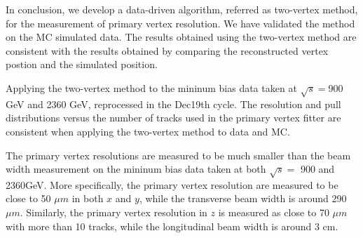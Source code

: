 In conclusion, we develop a data-driven algorithm, referred as two-vertex method, for the measurement of primary vertex resolution. We have validated the 
method on the MC simulated data. The results obtained using the 
two-vertex method are consistent with the results obtained by comparing 
the reconstructed vertex postion and the simulated position. 

Applying the two-vertex method to the mininum bias data taken at 
$\sqrt{s}=$900 GeV and 2360 GeV, reprocessed in the Dec19th cycle. 
The resolution and pull distributions versus the number 
of tracks used in the primary vertex fitter are consistent when applying 
the two-vertex method to data and MC. 

The primary vertex resolutions are measured to be much smaller than 
the beam width measurement on the mininum bias data taken at both 
$\sqrt{s}=$ 900 and 2360GeV.
More specifically, the primary vertex resolution 
are measured to be close to 50 $\mu m$ in both $x$ and $y$, 
while the transverse beam width is around 290 $\mu m$. 
Similarly, the primary vertex resolution in $z$ is measured as close to 
70 $\mu m$ with more than 10 tracks, while the longitudinal beam width 
is around $3$ cm. 



